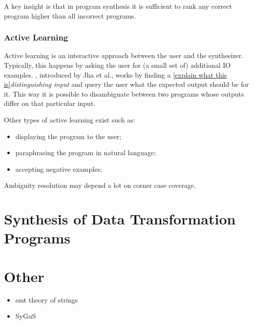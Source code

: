  A key insight is that in program synthesis it
is sufficient to rank any correct program higher than all incorrect programs.

\subsubsection{Active Learning}

Active learning is an interactive approach between the user and the synthesizer.
Typically, this happens by asking the user for (a small set of) additional
\ac{IO} examples. ,
introduced by Jha et al.\cite{Jha:oracle:2010}, works by finding a \ref{explain
what this is}\textit{distinguishing input} and query the user what the expected
output should be for it. This way it is possible to disambiguate between two
programs whose outputs differ on that particular input.

Other types of active learning exist such as:
\begin{itemize}
\item displaying the program to the user;
\item paraphrasing the program in natural language;
\item accepting negative examples; 
\end{itemize}

 Ambiguity resolution may depend a lot on corner case coverage.

\section{Synthesis of Data Transformation Programs}
\label{sec:data-trans-synth}


\section{Other}
\label{sec:other}

\begin{itemize}
\item smt theory of strings
\item SyGuS
\end{itemize}

